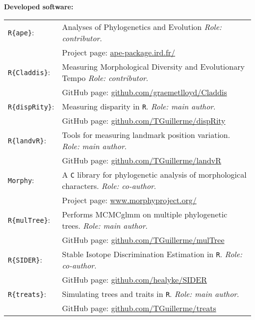 \documentclass[10pt,a4paper]{article}
\begin{document}
{\raggedright\textbf{Developed software:}\\[1.5ex]
\begin{tabular}{ll}
\texttt{R\{ape\}}: & Analyses of Phylogenetics and Evolution \textit{Role: contributor}. \\
                       & Project page: \href{http://ape-package.ird.fr/}{ape-package.ird.fr/} \\
\texttt{R\{Claddis\}}: & Measuring Morphological Diversity and Evolutionary Tempo \textit{Role: contributor}. \\
                       & GitHub page: \href{https://github.com/graemetlloyd/Claddis}{github.com/graemetlloyd/Claddis} \\
\texttt{R\{dispRity\}}: & Measuring disparity in \texttt{R}. \textit{Role: main author}.\\
                       & GitHub page: \href{https://github.com/TGuillerme/dispRity}{github.com/TGuillerme/dispRity}\\
\texttt{R\{landvR\}}: & Tools for measuring landmark position variation. \textit{Role: main author}. \\
                       & GitHub page: \href{https://github.com/TGuillerme/landvR}{github.com/TGuillerme/landvR} \\
\texttt{Morphy}: & A \texttt{C} library for phylogenetic analysis of morphological characters. \textit{Role: co-author}. \\
                       & Project page: \href{http://www.morphyproject.org/}{www.morphyproject.org/} \\
\texttt{R\{mulTree\}}: & Performs MCMCglmm on multiple phylogenetic trees. \textit{Role: main author}.\\
                       & GitHub page: \href{https://github.com/TGuillerme/mulTree}{github.com/TGuillerme/mulTree} \\
\texttt{R\{SIDER\}}: & Stable Isotope Discrimination Estimation in \texttt{R}. \textit{Role: co-author}. \\
                       & GitHub page: \href{https://github.com/healyke/SIDER}{github.com/healyke/SIDER} \\
\texttt{R\{treats\}}: & Simulating trees and traits in \texttt{R}. \textit{Role: main author}.\\
                       & GitHub page: \href{https://github.com/TGuillerme/treats}{github.com/TGuillerme/treats}\\
\end{tabular} \\


}
\end{document}
